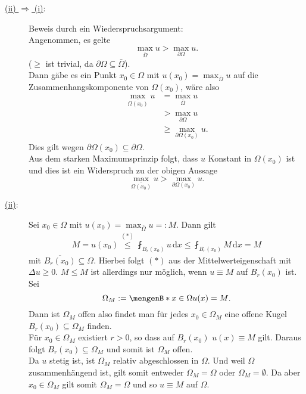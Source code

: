 \begin{beweis}
	\begin{description}
		\item[\underline{(ii) $\Rightarrow$ (i)}:] Beweis durch ein Wiederspruchsargument: \\
		Angenommen, es gelte 
		\begin{equation}
			\max_{\bar{\Omega}}u > \max_{\partial \Omega} u.
		\end{equation}
		($\geq$ ist trivial, da $\partial \Omega \subseteq \bar{\Omega}$). \\
		Dann gäbe es ein Punkt $x_0 \in \Omega$ mit $u(x_0) = \max_{\bar{\Omega}}u$ auf die Zusammenhangskomponente von $\Omega(x_0)$, wäre also
		\begin{align*}
			\max_{\overline{\Omega(x_0)}}u &= \max_{\bar{\Omega}}u \\
			&> \max_{\partial \Omega}u \\
			&\geq  \max_{ \partial \Omega(x_0)}u.
		\end{align*}
		Dies gilt wegen $ \partial \Omega(x_0) \subseteq \partial \Omega$. \\
		Aus dem starken Maximumsprinzip folgt, dass $u$ Konstant in $\Omega(x_0)$ ist und dies ist ein Widerspruch zu der obigen Aussage
		\[
			\max_{\overline{\Omega(x_0)}}u > \max_{\partial \Omega(x_0)} u.
		\]
		\item[\underline{(ii)}:] Sei $x_0 \in \Omega$ mit $u(x_0) = \max_{\bar{\Omega}}u =: M$. Dann gilt
		\begin{align*}
			M = u(x_0) \stackrel{(*)}{\leq } \fint_{B_r(x_0)}^{} u \,\mathrm{d}x \leq  \fint_{B_r(x_0)}^{} M \,\mathrm{d}x = M 
		\end{align*}
		mit $\overline{B_r(x_0)} \subseteq \Omega$. Hierbei folgt $(*)$ aus der Mittelwerteigenschaft mit $ \Delta u \geq 0$. $M \leq M$ ist allerdings nur möglich, 
		wenn $u \equiv M$ auf $B_r(x_0)$ ist. Sei
		\[
			\Omega_M := \set[x \in \Omega]{u(x)=M}.
		\]
		Dann ist $\Omega_M$ offen also findet man für jedes $x_0 \in \Omega_M$ eine offene Kugel $B_r(x_0) \subseteq \Omega_M$ finden. \\
		Für $x_0 \in \Omega_M$ existiert $r>0$, so dass auf $B_r(x_0)$ $u(x) \equiv M$ gilt. 
		Daraus folgt $B_r(x_0) \subseteq  \Omega_M$ und somit ist $\Omega_M$ offen. \\
		Da $u$ stetig ist, ist $\Omega_M$ relativ abgeschlossen in $\Omega$. 
		Und weil $\Omega$ zusammenhängend ist, gilt somit entweder $\Omega_M = \Omega$ oder $\Omega_M = \emptyset$.
		Da aber $x_0 \in \Omega_M$ gilt somit $\Omega_M = \Omega$ und so $u \equiv M$ auf $\Omega$.
	\end{description}
\end{beweis}

